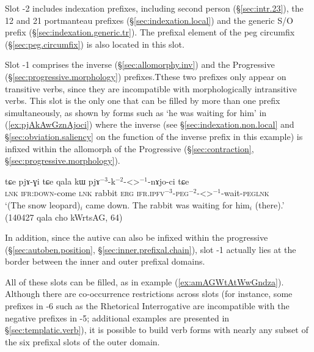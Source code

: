 Slot -2 includes indexation prefixes, including second person  (§\ref{sec:intr.23}), the  1\fl{}2  and  2\fl{}1 portmanteau prefixes (§\ref{sec:indexation.local}) and the generic S/O prefix  (§\ref{sec:indexation.generic.tr}). The prefixal element  of the peg circumfix (§\ref{sec:peg.circumfix}) is also located in this slot.

Slot -1 comprises the inverse  (§\ref{sec:allomorphy.inv}) and the Progressive  (§\ref{sec:progressive.morphology}) prefixes.Tthese two prefixes only appear on transitive verbs, since they are incompatible with morphologically intransitive verbs. This slot is the only one that can be filled by more than one prefix simultaneously, as shown by forms such as  `he was waiting for him' in (\ref{ex:pjAkAwGznAjoci}) where the inverse  (see §\ref{sec:indexation.non.local} and §\ref{sec:obviation.saliency} on the function of the inverse prefix in this example) is infixed within the  allomorph of the Progressive (§\ref{sec:contraction}, §\ref{sec:progressive.morphology}).

\begin{exe}
\ex \label{ex:pjAkAwGznAjoci}
\gll   tɕe pjɤ-ɣi tɕe qala kɯ pjɤ$^{-3}$-k$^{-2}$-<>$^{-1}$-nɤjo-ci  tɕe\\
\textsc{lnk} \textsc{ifr}:\textsc{down}-come \textsc{lnk} rabbit \textsc{erg} \textsc{ifr}.\textsc{ipfv}$^{-3}$-\textsc{peg}$^{-2}$-<>$^{-1}$-wait-\textsc{peg}\textsc{lnk}  \\
\glt `(The snow leopard)$_i$ came down. The rabbit was waiting for him$_i$ (there).' (140427 qala cho kWrtsAG, 64)
\end{exe}

In addition, since the autive  can also be infixed within the progressive (§\ref{sec:autoben.position}, §\ref{sec:inner.prefixal.chain}), slot -1 actually lies at the border between the inner and outer prefixal domains.

All of these slots can be filled, as in example (\ref{ex:amAGWtAtWwGndza}). Although there are co-occurrence restrictions across slots (for instance, some prefixes in -6 such as the Rhetorical Interrogative  are incompatible with the negative prefixes in -5; additional examples are presented in §\ref{sec:templatic.verb}), it is possible to build verb forms with nearly any subset of the six prefixal slots of the outer domain.


